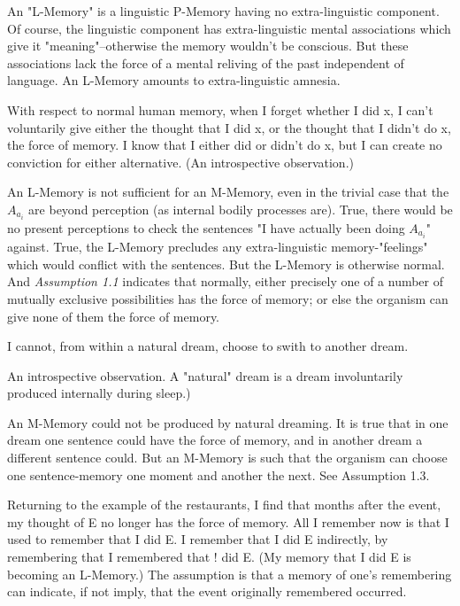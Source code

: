 \documentclass[10pt,twoside,draft]{memoir}
\begin{document}
{ An "L-Memory" is a linguistic P-Memory having no 
extra-linguistic component. Of course, the linguistic component has 
extra-linguistic mental associations which give it "meaning"--otherwise the 
memory wouldn't be conscious. But these associations lack the force of a 
mental reliving of the past independent of language. An L-Memory amounts 
to extra-linguistic amnesia. 

 With respect to normal human memory, when I forget 
whether I did x, I can't voluntarily give either the thought that I did x, or 
the thought that I didn't do x, the force of memory. I know that I either did 
or didn't do x, but I can create no conviction for either alternative. (An 
introspective observation.) 

 An L-Memory is not sufficient for an M-Memory, even 
in the trivial case that the $A_{a_i}$ are beyond perception (as internal bodily 
processes are). True, there would be no present perceptions to check the 
sentences "I have actually been doing $A_{a_i}$" against. True, the L-Memory 
precludes any extra-linguistic memory-"feelings" which would conflict with 
the sentences. But the L-Memory is otherwise normal. And \textit{Assumption 1.1}
indicates that normally, either precisely one of a number of mutually 
exclusive possibilities has the force of memory; or else the organism can give 
none of them the force of memory. 

 I cannot, from within a natural dream, choose to swith 
to another dream. {An introspective observation. A "natural" dream is a 
dream involuntarily produced internally during sleep.) 

 An M-Memory could not be produced by natural 
dreaming. It is true that in one dream one sentence could have the force of 
memory, and in another dream a different sentence could. But an M-Memory 
is such that the organism can choose one sentence-memory one moment and 
another the next. See Assumption 1.3. 

 Returning to the example of the restaurants, I find 
that months after the event, my thought of E no longer has the force of 
memory. All I remember now is that I used to remember that I did E. I 
remember that I did E indirectly, by remembering that I remembered that ! 
did E. (My memory that I did E is becoming an L-Memory.) The assumption 
is that a memory of one's remembering can indicate, if not imply, that the 
event originally remembered occurred. 

}}
\end{document}
